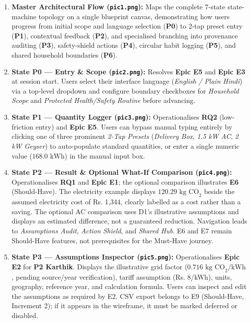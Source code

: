 \documentclass[12pt, a4paper]{article}
\begin{document}
\begin{enumerate}[leftmargin=1.8em, itemsep=0.3em]
    \item \textbf{Master Architectural Flow (\texttt{pic1.png}):} Maps the complete 7-state state-machine topology on a single blueprint canvas, demonstrating how users progress from initial scope and language selection (\textbf{P0}) to 2-tap preset entry (\textbf{P1}), contextual feedback (\textbf{P2}), and specialised branching into provenance auditing (\textbf{P3}), safety-shield actions (\textbf{P4}), circular habit logging (\textbf{P5}), and shared household boundaries (\textbf{P6}).
    \item \textbf{State P0 --- Entry \& Scope (\texttt{pic2.png}):} Resolves \textbf{Epic E5} and \textbf{Epic E3} at session start. Users select their interface language (\textit{English / Plain Hindi}) via a top-level dropdown and configure boundary checkboxes for \textit{Household Scope} and \textit{Protected Health/Safety Routine} before advancing.
    \item \textbf{State P1 --- Quantity Logger (\texttt{pic3.png}):} Operationalises \textbf{RQ2} (low-friction entry) and \textbf{Epic E5}. Users can bypass manual typing entirely by clicking one of three prominent \textit{2-Tap Presets} (\textit{Delivery Box}, \textit{1.5 kW AC}, \textit{2 kW Geyser}) to auto-populate standard quantities, or enter a single numeric value ($168.0\text{ kWh}$) in the manual input box.
    \item \textbf{State P2 --- Result \& Optional What-If Comparison (\texttt{pic4.png}):} Operationalises \textbf{RQ1} and \textbf{Epic E1}; the optional comparison illustrates \textbf{E6} (Should-Have). The electricity example displays $120.29\text{ kg CO}_2$ beside the assumed electricity cost of Rs. 1,344, clearly labelled as a cost rather than a saving. The optional AC comparison uses D1's illustrative assumptions and displays an estimated difference, not a guaranteed reduction. Navigation leads to \textit{Assumptions Audit}, \textit{Action Shield}, and \textit{Shared Hub}. E6 and E7 remain Should-Have features, not prerequisites for the Must-Have journey.
    \item \textbf{State P3 --- Assumptions Inspector (\texttt{pic5.png}):} Operationalises \textbf{Epic E2} for \textbf{P2 Karthik}. Displays the illustrative grid factor ($0.716\text{ kg CO}_2\text{/kWh}$, pending source/year verification), tariff assumption (Rs. 8/kWh), units, geography, reference year, and calculation formula. Users can inspect and edit the assumptions as required by E2. CSV export belongs to E9 (Should-Have, Increment 2); if it appears in the wireframe, it must be marked deferred or disabled.

\end{enumerate}
\end{document}
